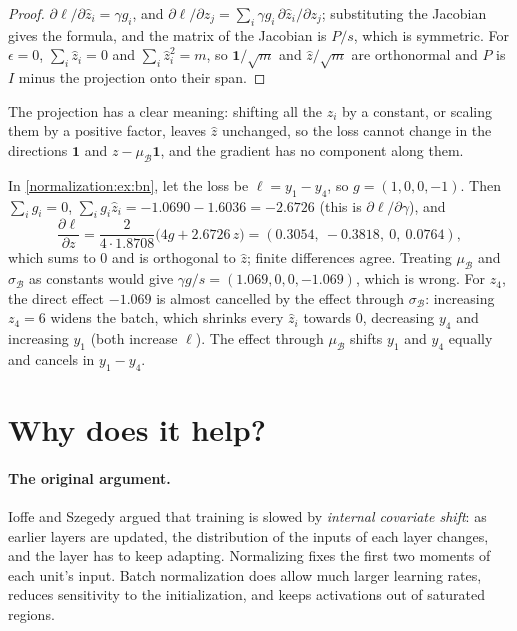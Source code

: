 \begin{notechapter}
\begin{proof}
$\partial\ell/\partial\hat z_i = \gamma g_i$, and $\partial\ell/\partial z_j = \sum_i\gamma g_i\,\partial\hat z_i/\partial z_j$; substituting the Jacobian gives the formula, and
the matrix of the Jacobian is $P/s$, which is symmetric. For $\epsilon = 0$, $\sum_i\hat z_i = 0$ and $\sum_i\hat z_i^2 = m$, so
$\mathbf 1/\sqrt m$ and $\hat z/\sqrt m$ are orthonormal and $P$ is $I$ minus the projection onto their span.
\end{proof}

The projection has a clear meaning: shifting all the $z_i$ by a constant, or scaling them by a
positive factor, leaves $\hat z$ unchanged, so the loss cannot change in the directions $\mathbf 1$ and
$z - \mu_{\mathcal B}\mathbf 1$, and the gradient has no component along them.

\begin{example}\label{normalization:ex:backward}
In \cref{normalization:ex:bn}, let the loss be $\ell = y_1 - y_4$, so $g = (1, 0, 0, -1)$. Then $\sum_ig_i = 0$,
$\sum_ig_i\hat z_i = -1.0690 - 1.6036 = -2.6726$ (this is $\partial\ell/\partial\gamma$), and
\[
  \frac{\partial\ell}{\partial z} = \frac2{4\cdot1.8708}\bigl(4g + 2.6726\,\hat z\bigr) = (0.3054,\ -0.3818,\ 0,\ 0.0764),
\]
which sums to $0$ and is orthogonal to $\hat z$; finite differences agree. Treating $\mu_{\mathcal B}$ and $\sigma_{\mathcal B}$ as
constants would give $\gamma g/s = (1.069, 0, 0, -1.069)$, which is wrong. For $z_4$, the direct effect $-1.069$ is almost cancelled by the effect through $\sigma_{\mathcal B}$:
increasing $z_4 = 6$ widens the batch, which shrinks every $\hat z_i$ towards $0$, decreasing $y_4$ and increasing
$y_1$ (both increase $\ell$). The effect through $\mu_{\mathcal B}$ shifts $y_1$ and $y_4$ equally and cancels in $y_1 - y_4$.
\end{example}

\section{Why does it help?}\label{normalization:sec:why}

\paragraph{The original argument.} Ioffe and Szegedy argued that training is slowed by
\emph{internal covariate shift}: as earlier layers are updated, the distribution of the inputs of
each layer changes, and the layer has to keep adapting. Normalizing fixes the first two
moments of each unit's input. Batch normalization does allow much larger learning rates,
reduces sensitivity to the initialization, and keeps activations out of saturated regions.


\end{notechapter}
